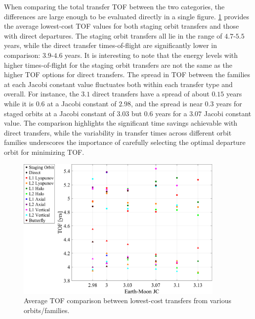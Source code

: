 When comparing the total transfer TOF between the two categories, the differences are large enough
to be evaluated directly in a single figure. \cref{fig:compareTOF} provides the average lowest-cost
TOF values for both staging orbit transfers and those with direct departures. The staging orbit
transfers all lie in the range of $4.7$-$5.5$ years, while the direct transfer times-of-flight are
significantly lower in comparison: $3.9$-$4.6$ years. It is interesting to note that the energy
levels with higher times-of-flight for the staging orbit transfers are not the same as the higher
TOF options for direct transfers. The spread in TOF between the families at each Jacobi constant
value fluctuates both within each transfer type and overall. For instance, the $3.1$ direct
transfers have a spread of about $0.15$ years while it is $0.6$ at a Jacobi constant of $2.98$, and
the spread is near $0.3$ years for staged orbits at a Jacobi constant of $3.03$ but $0.6$ years for
a $3.07$ Jacobi constant value. The comparison highlights the significant time savings achievable
with direct transfers, while the variability in transfer times across different orbit families
underscores the importance of carefully selecting the optimal departure orbit for minimizing TOF.

\begin{figure}[H]
    \centering
    \includegraphics[width=0.9\textwidth]{figures/TOFComparison.pdf}
    \caption{Average TOF comparison between lowest-cost transfers from various orbits/families.}
    \label{fig:compareTOF}
\end{figure}

